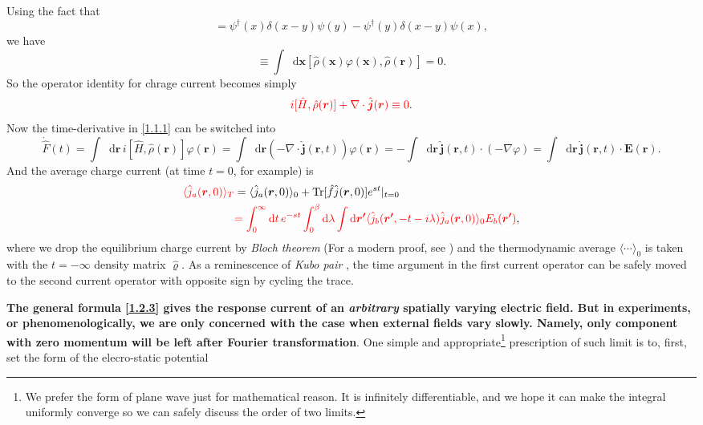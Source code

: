 \documentclass[10pt,nofootinbib,letterpaper]{revtex4}
\newcommand*\dd{\mathop{}\!\mathrm{d}}
\begin{document}
\fi
		\noindent Using the fact that
		\begin{equation*}
			[\hat\rho(x),\hat\rho(y)]=\psi^\dagger(x)\delta(x-y)\psi(y)-\psi^\dagger(y)\delta(x-y)\psi(x),
		\end{equation*}
		we have
		\begin{equation*}
			[\hat F,\hat\rho(\bm{r})]\equiv\int\dd\bm{x}[\hat{\rho}(\bm{x})\varphi(\bm{x}),\hat\rho(\bm{r})]=0.
		\end{equation*}
		So the operator identity for chrage current becomes simply
		\begin{equation}\label{1.2.2}
			{\color{red}i[\hat H,\hat\rho(\bm{r})]+\nabla\cdot\hat{\bm{j}}(\bm{r})\equiv0}.
		\end{equation}
		\indent Now the time-derivative in \eqref{1.1.1} can be switched into
		\begin{equation*}
			\dot{\hat F}(t)=\int\dd\bm{r}\,i[\hat H,\hat\rho(\bm{r})]\varphi(\bm{r})=\int\dd\bm{r}(-\nabla\cdot\hat{\bm{j}}(\bm{r},t))\varphi(\bm{r})=-\int\dd\bm{r}\,\hat{\bm{j}}(\bm{r},t)\cdot(-\nabla\varphi)=\int\dd\bm{r}\,\hat{\bm{j}}(\bm{r},t)\cdot\bm{E}(\bm{r}).
		\end{equation*}
		And the average charge current (at time $t=0$, for example) is
		\begin{align}
			{\color{red}\langle\hat j_a(\bm{r},0)\rangle_T}&=\langle\hat j_a(\bm{r},0)\rangle_0+\mathrm{Tr}[\hat{f}\hat j(\bm{r},0)]e^{st}|_{t=0}\nonumber\\
			&{\color{red}=\int_0^\infty\dd t\,e^{-st}\int_0^\beta\dd\lambda\int\dd\bm{r'}\langle\hat j_b(\bm{r'},-t-i\lambda)\hat j_a(\bm{r},0)\rangle_0 E_b(\bm{r'})},\label{1.2.3}
		\end{align}
		where we drop the equilibrium charge current by \emph{Bloch theorem} (For a modern proof, see \cite{watanabe2019proof}) and the thermodynamic average $\langle\cdots\rangle_0$ is taken with the $t=-\infty$ density matrix $\hat{\varrho}$. As a reminescence of \emph{Kubo pair} \cite{kubo1957statistical}, the time argument in the first current operator can be safely moved to the second current operator with opposite sign by cycling the trace.\par
		\textbf{The general formula \eqref{1.2.3} gives the response current of an \emph{arbitrary} spatially varying electric field. But in experiments, or phenomenologically, we are only concerned with the case when external fields vary slowly. Namely, only component with zero momentum will be left after Fourier transformation}. One simple and appropriate\footnote{We prefer the form of plane wave just for mathematical reason. It is infinitely differentiable, and we hope it can make the integral uniformly converge so we can safely discuss the order of two limits.} prescription of such limit is to, first, set the form of the elecro-static potential
\end{document}
